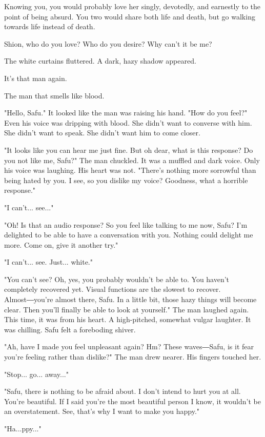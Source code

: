 Knowing you, you would probably love her singly, devotedly, and
earnestly to the point of being absurd. You two would share both life
and death, but go walking towards life instead of death.

Shion, who do you love? Who do you desire? Why can't it be me?

The white curtains fluttered. A dark, hazy shadow appeared.

It's that man again.

The man that smells like blood.

"Hello, Safu." It looked like the man was raising his hand. "How do you
feel?" Even his voice was dripping with blood. She didn't want to
converse with him. She didn't want to speak. She didn't want him to come
closer.

"It looks like you can hear me just fine. But oh dear, what is this
response? Do you not like me, Safu?" The man chuckled. It was a muffled
and dark voice. Only his voice was laughing. His heart was not. "There's
nothing more sorrowful than being hated by you. I see, so you dislike my
voice? Goodness, what a horrible response."

"I can't... see..."

"Oh! Is that an audio response? So you feel like talking to me now,
Safu? I'm delighted to be able to have a conversation with you. Nothing
could delight me more. Come on, give it another try."

"I can't... see. Just... white."

"You can't see? Oh, yes, you probably wouldn't be able to. You haven't
completely recovered yet. Visual functions are the slowest to recover.
Almost―you're almost there, Safu. In a little bit, those hazy things
will become clear. Then you'll finally be able to look at yourself." The
man laughed again. This time, it was from his heart. A high-pitched,
somewhat vulgar laughter. It was chilling. Safu felt a foreboding
shiver.

"Ah, have I made you feel unpleasant again? Hm? These waves―Safu, is it
fear you're feeling rather than dislike?" The man drew nearer. His
fingers touched her.

"Stop... go... away..."

"Safu, there is nothing to be afraid about. I don't intend to hurt you
at all. You're beautiful. If I said you're the most beautiful person I
know, it wouldn't be an overstatement. See, that's why I want to make
you happy."

"Ha...ppy..."

